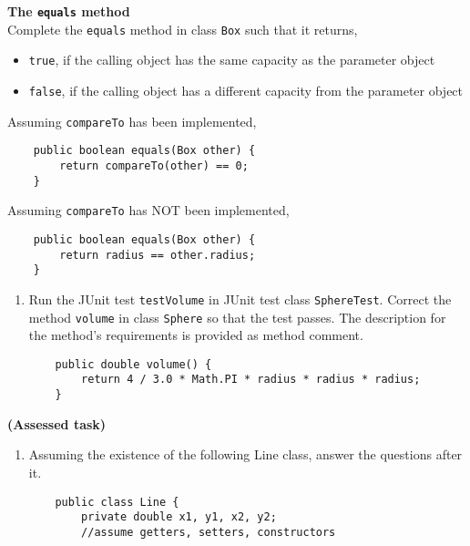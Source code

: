\begin{questions}
\question \textbf{The \texttt{equals} method}\\
Complete the \texttt{equals} method in class \texttt{Box} such that it returns,

\begin{itemize}
\item \texttt{true}, if the calling object has the same capacity as the parameter object
\item \texttt{false}, if the calling object has a different capacity from the parameter object
\end{itemize}

\begin{solution}
Assuming \texttt{compareTo} has been implemented,
\begin{lstlisting}
	public boolean equals(Box other) {
		return compareTo(other) == 0;
	}
\end{lstlisting}

Assuming \texttt{compareTo} has NOT been implemented,
\begin{lstlisting}
	public boolean equals(Box other) {
		return radius == other.radius;
	}
\end{lstlisting}
\end{solution}


\begin{enumerate}
\item Run the JUnit test \texttt{testVolume} in JUnit test class \texttt{SphereTest}. Correct the method \texttt{volume} in class \texttt{Sphere} so that the test passes. The description for the method's requirements is provided as method comment.

\begin{solution}
\begin{lstlisting}
	public double volume() {
		return 4 / 3.0 * Math.PI * radius * radius * radius;
	}
\end{lstlisting}
\end{solution}
\end{enumerate}

\ifprintanswers
\else
\newpage
\fi

\question \textbf{(Assessed task)}
	\begin{enumerate}
		\item Assuming the existence of the following Line class, answer the questions after it.
		
\begin{lstlisting}
	public class Line {
		private double x1, y1, x2, y2;
		//assume getters, setters, constructors	
		

\end{lstlisting}
\end{enumerate}
\end{questions}
